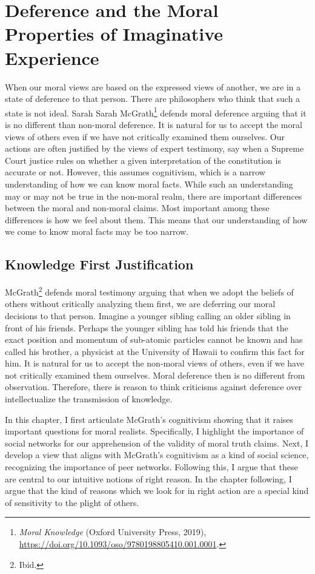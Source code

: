 \documentclass[
  12pt,
]{book}
\theoremstyle{definition}
\theoremstyle{definition}
\theoremstyle{definition}
\theoremstyle{definition}
\theoremstyle{remark}
\begin{document}
\chapter{Deference and the Moral Properties of Imaginative Experience}\label{deference-and-the-moral-properties-of-imaginative-experience}

When our moral views are based on the expressed views of another, we are in a state of deference to that person. There are philosophers who think that such a state is not ideal. Sarah Sarah McGrath\footnote{\emph{Moral {Knowledge}} (Oxford University Press, 2019), \url{https://doi.org/10.1093/oso/9780198805410.001.0001}.} defends moral deference arguing that it is no different than non-moral deference. It is natural for us to accept the moral views of others even if we have not critically examined them ourselves. Our actions are often justified by the views of expert testimony, say when a Supreme Court justice rules on whether a given interpretation of the constitution is accurate or not. However, this assumes cognitivism, which is a narrow understanding of how we can know moral facts. While such an understanding may or may not be true in the non-moral realm, there are important differences between the moral and non-moral claims. Most important among these differences is how we feel about them. This means that our understanding of how we come to know moral facts may be too narrow.

\section{Knowledge First Justification}\label{knowledge-first-justification}

McGrath\footnote{Ibid.} defends moral testimony arguing that when we adopt the beliefs of others without critically analyzing them first, we are deferring our moral decisions to that person. Imagine a younger sibling calling an older sibling in front of his friends. Perhaps the younger sibling has told his friends that the exact position and momentum of sub-atomic particles cannot be known and has called his brother, a physicist at the University of Hawaii to confirm this fact for him. It is natural for us to accept the non-moral views of others, even if we have not critically examined them ourselves. Moral deference then is no different from observation. Therefore, there is reason to think criticisms against deference over intellectualize the transmission of knowledge.

In this chapter, I first articulate McGrath's cognitivism showing that it raises important questions for moral realists. Specifically, I highlight the importance of social networks for our apprehension of the validity of moral truth claims. Next, I develop a view that aligns with McGrath's cognitivism as a kind of social science, recognizing the importance of peer networks. Following this, I argue that these are central to our intuitive notions of right reason. In the chapter following, I argue that the kind of reasons which we look for in right action are a special kind of sensitivity to the plight of others.
\end{document}
